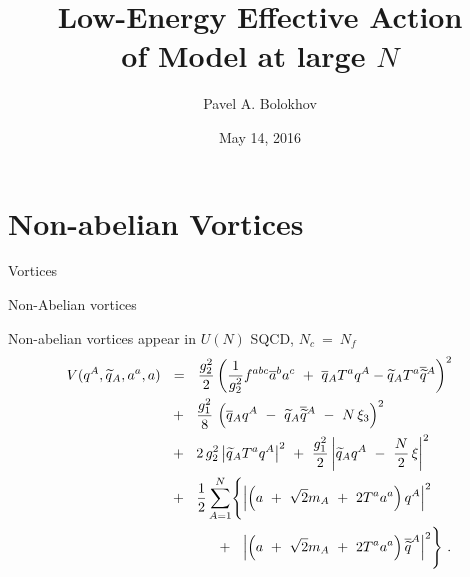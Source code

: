 \documentclass{beamer}
\title[Effective Action of \cp]
      {Low-Energy Effective Action\\
       of \cp Model at large $ N $}
\author{Pavel A. Bolokhov}
\date{May 14, 2016}
\institute[University of Minnesota Duluth \& SPbSU]{University of Minnesota Duluth}
\begin{document}
\maketitle




\section{Non-abelian Vortices}
\begin{frame}{}
\fontsize{60pt}{60pt}\selectfont
\begin{center}
        Vortices
\end{center}
\end{frame}


\begin{frame}{Non-Abelian vortices}

  Non-abelian vortices appear in \ntwo $ U(N) $ SQCD, $ N_c ~=~ N_f $\\
  {\tiny{}}
  \begin{align*}
    V(q^A,\wt{q}{}_A,a^a,a) &~~=~~
    \frac{g_2^2}{2} \left( \frac{1}{g_2^2}f^{abc}\ov{a}{}^b a^c  ~+~
    \ov{q}{}_A T^a q^A  - \wt{q}{}_A T^a \ov{\wt{q}}{}^A \right)^2 \\
    & ~~+~~ \frac{g_1^2}{8}\, \left(\ov{q}{}_A q^A ~-~ \wt{q}{}_A\ov{\wt{q}}{}^A ~-~ N\,\xi_3 \right)^2 \\
    & ~~+~~ 2\,g_2^2 \left| \wt{q}{}_A T^a q^A \right|^2 ~+~
    \frac{g_1^2}{2} \left| \wt{q}_A q^A ~-~ \frac{N}{2}\, \xi \right|^2 \\
    & ~~+~~ \frac{1}{2} \sum_{A=1}^N \Biggl\{ \left|\left(a ~+~ \sqrt{2}m_A ~+~ 2T^a a^a\right)q^A\right|^2 \\
    & \phantom{\frac{1}{2}\sum_{A=1}^N \Biggl\{ } ~~+~~
    \left| \left( a ~+~ \sqrt{2}m_A ~+~ 2T^a a^a\right) \ov{\wt{q}}^A \right|^2 \Biggr\}~.
    \end{align*}
  
\end{frame}
\end{document}
